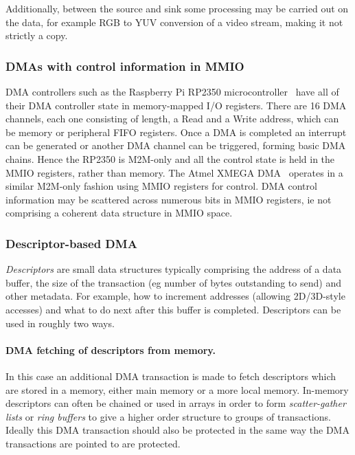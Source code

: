 Additionally, between the source and sink some processing may be carried out on the data, for example RGB to YUV conversion of a video stream, making it not strictly a copy.

\subsubsection{DMAs with control information in MMIO}
DMA controllers such as the Raspberry Pi RP2350 microcontroller~\cite{rp2350} have all of their DMA controller state in memory-mapped I/O registers.
There are 16 DMA channels, each one consisting of length, a Read and a Write address, which can be memory or peripheral FIFO registers.
Once a DMA is completed an interrupt can be generated or another DMA channel can be triggered, forming basic DMA chains.
Hence the RP2350 is M2M-only and all the control state is held in the MMIO registers, rather than memory.
The Atmel XMEGA DMA~\cite{atmel-xmegadma} operates in a similar M2M-only fashion using MMIO registers for control.
DMA control information may be scattered across numerous bits in MMIO registers, ie not comprising a coherent data structure in MMIO space.


\subsubsection{Descriptor-based DMA}
\emph{Descriptors} are small data structures typically comprising the address of a data buffer, the size of the transaction (eg number of bytes outstanding to send) and other metadata.
For example, how to increment addresses (allowing 2D/3D-style accesses) and what to do next after this buffer is completed.
Descriptors can be used in roughly two ways.

\paragraph{DMA fetching of descriptors from memory.}
In this case an additional DMA transaction is made to fetch descriptors which are stored in a memory, either main memory or a more local memory.
In-memory descriptors can often be chained or used in arrays in order to form \emph{scatter-gather lists} or \emph{ring buffers} to give a higher order structure to groups of transactions.
Ideally this DMA transaction should also be protected in the same way the DMA transactions are pointed to are protected.

